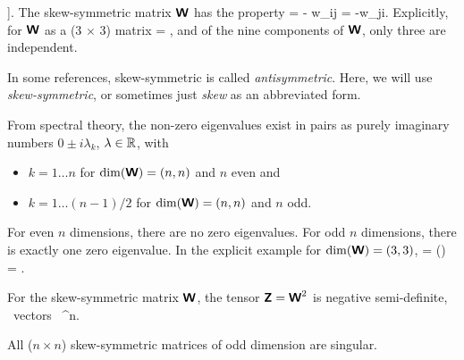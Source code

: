 \right].
\ee
The skew-symmetric matrix $\mbox{\sffamily\bfseries W}$ has the property
\be
\tWbold = -\tWbold\transpose 
\;\;\Longleftrightarrow\;\; w_{ij} = -w_{ji}.
\ee
Explicitly, for $\mbox{\sffamily\bfseries W}$ as a (3 $\times$ 3) matrix
\be
\tWbold
= 
,
\ee
and of the nine components of $\mbox{\sffamily\bfseries W}$, only three are independent.

\begin{Hremark}
In some references, skew-symmetric is called {\em antisymmetric}.  Here, 
    we will use {\em skew-symmetric}, or sometimes just {\em skew} as an
    abbreviated form.
\end{Hremark}


\begin{Hremark}
From spectral theory, the non-zero eigenvalues exist in pairs as purely 
    imaginary numbers $0 \pm i \lambda_k$, $\lambda \in \mathbb{R}$, with
    \begin{itemize}
        \item $k=1\ldots n$ for $\dim(\mbox{\sffamily\bfseries W}) = (n, n)$ and $n$ even and 
        \item $k=1\ldots(n - 1)/2$ for $\dim(\mbox{\sffamily\bfseries W}) = (n, n)$ and $n$ odd.
    \end{itemize}
    For even $n$ dimensions, there are no zero eigenvalues.  
    For odd $n$ dimensions, there is
    exactly one zero eigenvalue.
In the explicit example for $\dim(\mbox{\sffamily\bfseries W}) = (3,3)$, 
\be 
    \ve{\Lambda} = \mbox{\eig}(\tWbold) 
= 
.
\ee
\end{Hremark}

\begin{Hremark}
For the skew-symmetric matrix $\mbox{\sffamily\bfseries W}$, the tensor $\mbox{\sffamily\bfseries Z} = \mbox{\sffamily\bfseries W}^2$ is 
negative semi-definite,
\be
    \vv\transpose \tZbold \vv {} \;\; \forall \mbox{ vectors } \vv \in \real^n.
\ee
\end{Hremark}

\begin{Hresult}
\label{result:skewsingular}
All ($n \times n$) skew-symmetric matrices of odd dimension are singular.
\end{Hresult}

